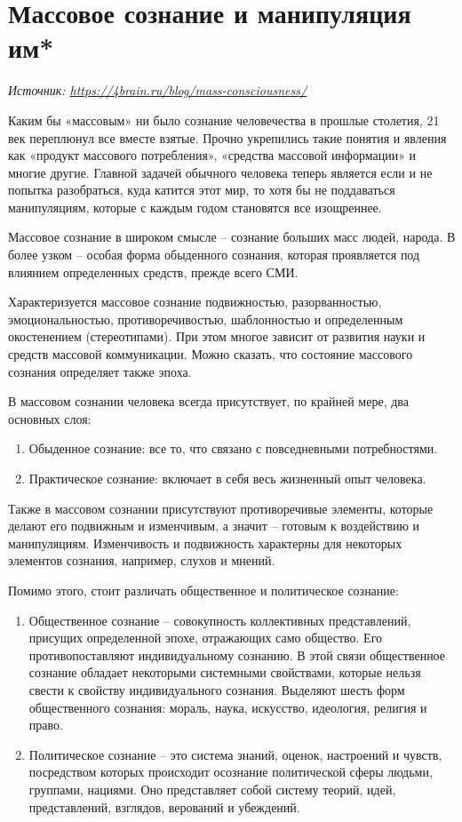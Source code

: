 \newpage
\section{Массовое сознание и манипуляция им*}

\textit{Источник: \url{https://4brain.ru/blog/mass-consciousness/}}

Каким бы «массовым» ни было сознание человечества в прошлые столетия, 21 век переплюнул все вместе взятые. Прочно укрепились такие понятия и явления как «продукт массового потребления», «средства массовой информации» и многие другие. Главной задачей обычного человека теперь является если и не попытка разобраться, куда катится этот мир, то хотя бы не поддаваться манипуляциям, которые с каждым годом становятся все изощреннее.

Массовое сознание в широком смысле – сознание больших масс людей, народа. В более узком – особая форма обыденного сознания, которая проявляется под влиянием определенных средств, прежде всего СМИ.

Характеризуется массовое сознание подвижностью, разорванностью, эмоциональностью, противоречивостью, шаблонностью и определенным окостенением (стереотипами). При этом многое зависит от развития науки и средств массовой коммуникации. Можно сказать, что состояние массового сознания определяет также эпоха.

В массовом сознании человека всегда присутствует, по крайней мере, два основных слоя:

\begin{enumerate}
    \item Обыденное сознание: все то, что связано с повседневными потребностями.
    \item Практическое сознание: включает в себя весь жизненный опыт человека.
\end{enumerate}

Также в массовом сознании присутствуют противоречивые элементы, которые делают его подвижным и изменчивым, а значит – готовым к воздействию и манипуляциям. Изменчивость и подвижность характерны для некоторых элементов сознания, например, слухов и мнений.

Помимо этого, стоит различать общественное и политическое сознание:

\begin{enumerate}
    \item Общественное сознание – совокупность коллективных представлений, присущих определенной эпохе, отражающих само общество. Его противопоставляют индивидуальному сознанию. В этой связи общественное сознание обладает некоторыми системными свойствами, которые нельзя свести к свойству индивидуального сознания. Выделяют шесть форм общественного сознания: мораль, наука, искусство, идеология, религия и право.
    \item Политическое сознание – это система знаний, оценок, настроений и чувств, посредством которых происходит осознание политической сферы людьми, группами, нациями. Оно представляет собой систему теорий, идей, представлений, взглядов, верований и убеждений.
\end{enumerate}

